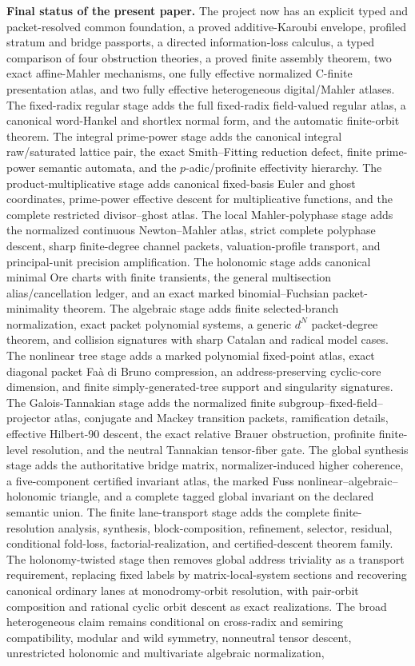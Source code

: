 \begin{resultbox}
\textbf{Final status of the present paper.}
The project now has an explicit typed and packet-resolved common foundation, a proved additive-Karoubi envelope, profiled stratum and bridge passports, a directed information-loss calculus, a typed comparison of four obstruction theories, a proved finite assembly theorem, two exact affine-Mahler mechanisms, one fully effective normalized C-finite presentation atlas, and two fully effective heterogeneous digital/Mahler atlases. The fixed-radix regular stage adds the full fixed-radix field-valued regular atlas, a canonical word-Hankel and shortlex normal form, and the automatic finite-orbit theorem. The integral prime-power stage adds the canonical integral raw/saturated lattice pair, the exact Smith--Fitting reduction defect, finite prime-power semantic automata, and the \(p\)-adic/profinite effectivity hierarchy. The product-multiplicative stage adds canonical fixed-basis Euler and ghost coordinates, prime-power effective descent for multiplicative functions, and the complete restricted divisor--ghost atlas. The local Mahler-polyphase stage adds the normalized continuous Newton--Mahler atlas, strict complete polyphase descent, sharp finite-degree channel packets, valuation-profile transport, and principal-unit precision amplification. The holonomic stage adds canonical minimal Ore charts with finite transients, the general multisection alias/cancellation ledger, and an exact marked binomial--Fuchsian packet-minimality theorem. The algebraic stage adds finite selected-branch normalization, exact packet polynomial systems, a generic $d^N$ packet-degree theorem, and collision signatures with sharp Catalan and radical model cases. The nonlinear tree stage adds a marked polynomial fixed-point atlas, exact diagonal packet Fa\`a di Bruno compression, an address-preserving cyclic-core dimension, and finite simply-generated-tree support and singularity signatures. The Galois-Tannakian stage adds the normalized finite subgroup--fixed-field--projector atlas, conjugate and Mackey transition packets, ramification details, effective Hilbert-90 descent, the exact relative Brauer obstruction, profinite finite-level resolution, and the neutral Tannakian tensor-fiber gate. The global synthesis stage adds the authoritative bridge matrix, normalizer-induced higher coherence, a five-component certified invariant atlas, the marked Fuss nonlinear--algebraic--holonomic triangle, and a complete tagged global invariant on the declared semantic union. The finite lane-transport stage adds the complete finite-resolution analysis, synthesis, block-composition, refinement, selector, residual, conditional fold-loss, factorial-realization, and certified-descent theorem family. The holonomy-twisted stage then removes global address triviality as a transport requirement, replacing fixed labels by matrix-local-system sections and recovering canonical ordinary lanes at monodromy-orbit resolution, with pair-orbit composition and rational cyclic orbit descent as exact realizations. The broad heterogeneous claim remains conditional on cross-radix and semiring compatibility, modular and wild symmetry, nonneutral tensor descent, unrestricted holonomic and multivariate algebraic normalization, 
\end{resultbox}
